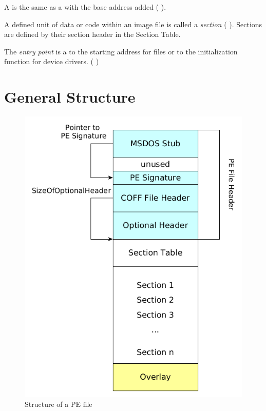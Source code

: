 \begin{definition}[VA]
A \emph{\VA{}} is the same as a \RVA{} with the base address added (\cf{} \cite[]{pespec}).
\end{definition} 

\begin{definition}[section]
A defined unit of data or code within an image file is called a \emph{section} (\cf{} \cite[]{pespec}). Sections are defined by their section header in the Section Table.
\end{definition} 

\begin{definition}
The \emph{entry point} is a \RVA{} to the starting address for \EXE{} files or to the initialization function for device drivers. (\cf{} \cite[]{pespec}) \label{def:entrypoint} 
\end{definition} 

\section{General Structure} \label{sec:pestructure}

\begin{figure}
\includegraphics[width=.98\textwidth, height=.60\textheight,keepaspectratio]{graphics/peformat}
\caption{Structure of a PE file}
\label{fig:peformat} 
\end{figure}

